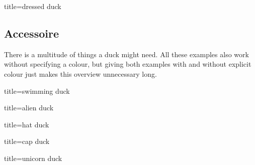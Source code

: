 \documentclass{scrartcl}
\begin{document}
\begin{tcblisting}{title={dressed duck}}
\begin{tikzpicture}
	\duck[tshirt]
\end{tikzpicture}
\begin{tikzpicture}
	\duck[jacket]
\end{tikzpicture}

\begin{tikzpicture}
	\duck[tie]
\end{tikzpicture}
\begin{tikzpicture}
	\duck[tshirt=lightgray, 
			jacket=blue!50!black, 
			tie=blue!80!black, 
			shorthair]
\end{tikzpicture}
\end{tcblisting}

\subsection{Accessoire}

There is a multitude of things a duck might need. All these examples also work without specifying a colour, but giving both examples with and without explicit colour just makes this overview unnecessary long.

\begin{tcblisting}{title={swimming duck}}
\begin{tikzpicture}
	\duck[water=cyan!50!blue]
\end{tikzpicture}
\end{tcblisting}

\begin{tcblisting}{title={alien duck}}
\begin{tikzpicture}
	\duck[alien=green!50!brown]
\end{tikzpicture}
\end{tcblisting}

\begin{tcblisting}{title={hat duck}}
\begin{tikzpicture}
	\duck[hat=red!50!black]
\end{tikzpicture}
\end{tcblisting}

\begin{tcblisting}{title={cap duck}}
\begin{tikzpicture}
	\duck[cap=red]
\end{tikzpicture}
\end{tcblisting}

\begin{tcblisting}{title={unicorn duck}}
\begin{tikzpicture}
	\duck[body=pink,
	unicorn=magenta!60!violet,
	longhair=magenta!60!violet]
\end{tikzpicture}
\end{tcblisting}
\end{document}
